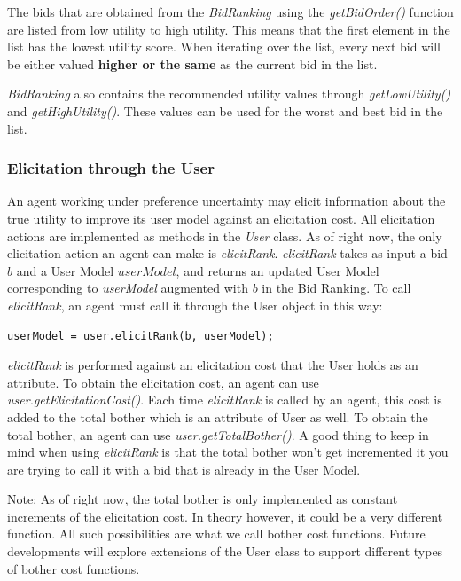 \documentclass[]{llncs}
\begin{document}
The bids that are obtained from the \textit{BidRanking} using the \textit{getBidOrder()} function are listed from low utility to high utility. This means that the first element in the list has the lowest utility score. When iterating over the list, every next bid will be either valued \textbf{higher or the same} as the current bid in the list.

\textit{BidRanking} also contains the recommended utility values through \textit{getLowUtility()} and \textit{getHighUtility()}. These values can be used for the worst and best bid in the list.


\subsubsection{Elicitation through the User}
An agent working under preference uncertainty may elicit information about the true utility to improve its user model against an elicitation cost. All elicitation actions are implemented as methods in the \textit{User} class. As of right now, the only elicitation action an agent can make is \textit{elicitRank}. \textit{elicitRank} takes as input a bid $b$ and a User Model $userModel$, and returns an updated User Model corresponding to \textit{userModel} augmented with $b$ in the Bid Ranking. To call \textit{elicitRank}, an agent must call it through the User object in this way:
\begin{lstlisting}
userModel = user.elicitRank(b, userModel);
\end{lstlisting}

\textit{elicitRank} is performed against an elicitation cost that the User holds as an attribute. To obtain the elicitation cost, an agent can use \textit{user.getElicitationCost()}. Each time \textit{elicitRank} is called by an agent, this cost is added to the total bother which is an attribute of User as well. To obtain the total bother, an agent can use \textit{user.getTotalBother()}. 
A good thing to keep in mind when using \textit{elicitRank} is that the total bother won't get incremented it you are trying to call it with a bid that is already in the User Model. 

Note: As of right now, the total bother is only implemented as constant increments of the elicitation cost. In theory however, it could be a very different function. All such possibilities are what we call bother cost functions. Future developments will explore extensions of the User class to support different types of bother cost functions.
\end{document}
